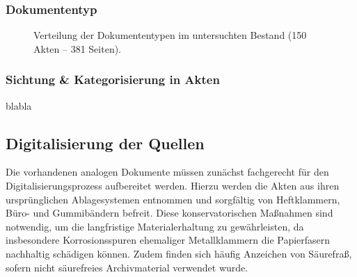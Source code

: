 \documentclass[12pt, a4paper, ngerman, bidi=default]{article}
\makeatletter
\let\oldparagraph\paragraph%
\renewcommand{\paragraph}{
    \@ifstar%
      \xxxParagraphStar%
      \xxxParagraphNoStar%
 }
\newcommand{\xxxParagraphStar}[1]{\oldparagraph*{#1}\mbox{}}
\newcommand{\xxxParagraphNoStar}[1]{\oldparagraph{#1}\mbox{}}
\makeatother
\begin{document}
\subsubsection{Dokumententyp}

\begin{figure}[htbp]
  \centering
  \caption{Verteilung der Dokumententypen im untersuchten Bestand (150 Akten – 381 Seiten).}\label{fig:dokumententypen-bar}
\end{figure}



\subsubsection{Sichtung \& Kategorisierung in Akten}
blabla

\subsection{Digitalisierung der Quellen}

Die vorhandenen analogen Dokumente müssen zunächst fachgerecht für den Digitalisierungsprozess aufbereitet werden. 
Hierzu werden die Akten aus ihren ursprünglichen Ablagesystemen entnommen und sorgfältig von Heftklammern, Büro- und Gummibändern 
befreit. Diese konservatorischen Maßnahmen sind notwendig, um die langfristige Materialerhaltung zu gewährleisten, 
da insbesondere Korrosionsspuren ehemaliger Metallklammern die Papierfasern nachhaltig schädigen können. Zudem finden sich häufig 
Anzeichen von Säurefraß, sofern nicht säurefreies Archivmaterial verwendet wurde.
\end{document}
